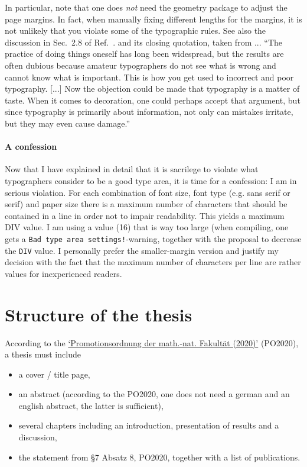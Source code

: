 In particular, note that one does \emph{not} need the geometry package to adjust the page margins. In fact, when manually fixing different lengths for the margins, it is not unlikely that you violate some of the typographic rules. See also the discussion in Sec.~2.8 of Ref.~. and its closing quotation, taken from ... ``The practice of doing things oneself has long been widespread, but the results are often dubious because amateur typographers do not see what is wrong and cannot know what is important. This is how you get used to incorrect and poor typography. [...] Now the objection could be made that typography is a matter of taste. When it comes to decoration, one could perhaps accept that argument, but since typography is primarily about information, not only can mistakes irritate, but they may even cause damage.''

\paragraph{A confession} Now that I have explained in detail that it is sacrilege to violate what typographers consider to be a good type area, it is time for a confession: I am in serious violation. 
For each combination of font size, font type (e.g. sans serif or serif) and paper size there is a maximum number of characters that should be contained in a line in order not to impair readability. This yields a maximum DIV value. I am using a value (16) that is way too large (when compiling, one gets a \verb|Bad type area settings!|-warning, together with the proposal to decrease the \verb|DIV| value. I personally prefer the smaller-margin version and justify my decision with the fact that the maximum number of characters per line are rather values for inexperienced readers.


\section{Structure of the thesis}

According to the \href{https://mathnat.uni-koeln.de/sites/dekanat/official/Ordnungen/Promotionsordnung_2020.pdf}{`Promotionsordnung der math.-nat. Fakultät (2020)'} (PO2020), a thesis must include
\begin{itemize}
	\item a cover / title page,
	\item an abstract (according to the PO2020, one does not need a german and an english abstract, the latter is sufficient),
	\item several chapters including an introduction, presentation of results and a discussion,
	\item the statement from §7 Absatz 8, PO2020, together with a list of publications.
\end{itemize}

